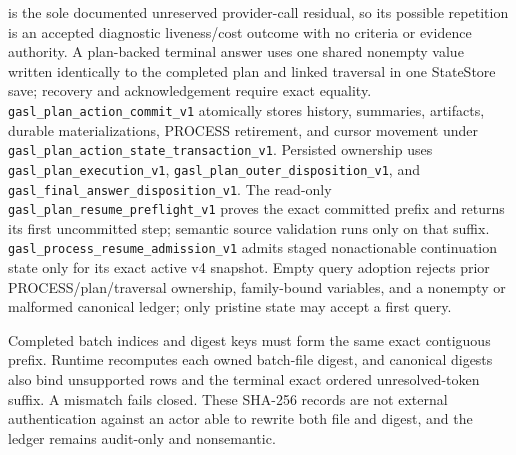 \documentclass[11pt]{article}
\newcommand{\code}[1]{\path{#1}}
\newcommand{\action}[1]{\texttt{#1}}
\begin{document}
is the sole documented unreserved provider-call residual, so its possible
repetition is an accepted diagnostic liveness/cost outcome with no criteria or
evidence authority.  A plan-backed terminal answer uses one shared nonempty
\code{terminal\_final\_answer\_at} value written identically to the completed
plan and linked traversal in one StateStore save; recovery and acknowledgement
require exact equality.  \action{gasl\_plan\_action\_commit\_v1} atomically
stores history, summaries, artifacts, durable materializations, PROCESS
retirement, and cursor movement under
\action{gasl\_plan\_action\_state\_transaction\_v1}.  Persisted ownership uses
\action{gasl\_plan\_execution\_v1},
\action{gasl\_plan\_outer\_disposition\_v1}, and
\action{gasl\_final\_answer\_disposition\_v1}.  The read-only
\action{gasl\_plan\_resume\_preflight\_v1} proves the exact committed prefix and
returns its first uncommitted step; semantic source validation runs only on
that suffix.  \action{gasl\_process\_resume\_admission\_v1} admits staged
nonactionable continuation state only for its exact active v4 snapshot.  Empty
query adoption rejects prior PROCESS/plan/traversal ownership, family-bound
variables, and a nonempty or malformed canonical ledger; only pristine state
may accept a first query.

Completed batch indices and digest keys must form the same exact contiguous
prefix.  Runtime recomputes each owned batch-file digest, and canonical digests
also bind unsupported rows and the terminal exact ordered unresolved-token
suffix.  A mismatch fails closed.  These SHA-256 records are not external
authentication against an actor able to rewrite both file and digest, and the
ledger remains audit-only and nonsemantic.
\end{document}
